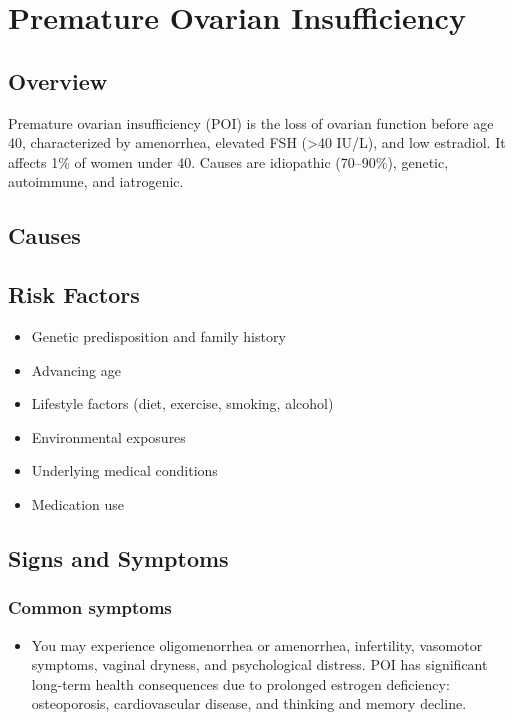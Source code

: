 \chapter{Premature Ovarian Insufficiency}
\label{sec:Premature Ovarian Insufficiency}

\section{Overview}
Premature ovarian insufficiency (POI) is the loss of ovarian function before age 40, characterized by amenorrhea, elevated FSH (>40 IU/L), and low estradiol. It affects 1\% of women under 40. Causes are idiopathic (70--90\%), genetic, autoimmune, and iatrogenic.
\section{Causes}
\section{Risk Factors}

\begin{itemize}[noitemsep]
  \item Genetic predisposition and family history
  \item Advancing age
  \item Lifestyle factors (diet, exercise, smoking, alcohol)
  \item Environmental exposures
  \item Underlying medical conditions
  \item Medication use
\end{itemize}
\section{Signs and Symptoms}

\subsection{Common symptoms}
\begin{itemize}[noitemsep]
  \item You may experience oligomenorrhea or amenorrhea, infertility, vasomotor symptoms, vaginal dryness, and psychological distress. POI has significant long-term health consequences due to prolonged estrogen deficiency: osteoporosis, cardiovascular disease, and thinking and memory decline. 
  \end{itemize}

